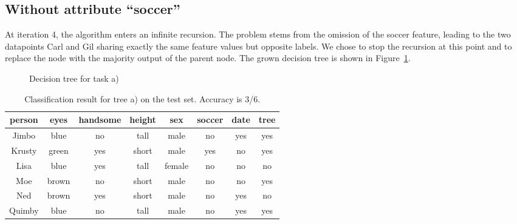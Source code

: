 \documentclass{scrartcl}
\begin{document}
\subsection{Without attribute ``soccer''}

At iteration 4, the algorithm enters an infinite recursion.
The problem stems from the omission of the soccer feature,
leading to the two datapoints Carl and Gil sharing exactly the same feature values but opposite labels.
We chose to stop the recursion at this point and to replace the node with the majority output of the parent node.
The grown decision tree is shown in Figure~\ref{fig:tree-nosoccer}.

\begin{figure}
\centering 
{}
\caption{Decision tree for task a)}
\label{fig:tree-nosoccer}
\end{figure}

\begin{table}[h!]
  \centering
  \begin{tabular}{cccccc|c|c}
    \toprule
    person      & eyes  & handsome & height & sex    & soccer & date & tree\\
    \midrule
    Jimbo       & blue  & no       & tall   & male   & no     & yes & yes\\
    Krusty      & green & yes      & short  & male   & yes    & no  & yes\\
    Lisa        & blue  & yes      & tall   & female & no     & no  & no\\
    Moe         & brown & no       & short  & male   & no     & no  & yes\\
    Ned         & brown & yes      & short  & male   & no     & yes & no\\
    Quimby      & blue  & no       & tall   & male   & no     & yes & yes\\
    \bottomrule
  \end{tabular}
  \caption{Classification result for tree a) on the test set. Accuracy is 3/6.}
\end{table}
\end{document}
